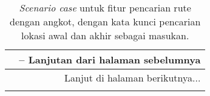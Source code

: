 \vspace{-0.25cm}
\begin{longtable}{| l | c p{10cm} |}
	\caption{\textit{Scenario case} untuk fitur pencarian rute dengan angkot, dengan kata kunci pencarian lokasi awal dan akhir sebagai masukan.}
    \label{tab:thesisapp-scenariocase-findroutedirect} \\
	
	\hline 
	\endfirsthead
	
	\multicolumn{3}{c}{\tablename\ \thetable{} -- Lanjutan dari halaman sebelumnya} \\
	\hline 
	\endhead
	
	\hline \multicolumn{3}{|r|}{{Lanjut di halaman berikutnya...}} \\ \hline
	\endfoot
	
	\hline
	\endlastfoot


\end{longtable}
